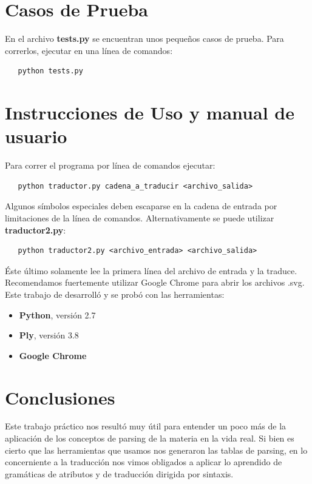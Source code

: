\newpage
\section{Casos de Prueba}

\indent En el archivo \textbf{tests.py} se encuentran unos pequeños casos de prueba.
\indent Para correrlos, ejecutar en una línea de comandos:
\begin{verbatim}
   python tests.py
\end{verbatim}

\section{Instrucciones de Uso y manual de usuario}

\indent \indent Para correr el programa por línea de comandos ejecutar:\\
\begin{verbatim}
   python traductor.py cadena_a_traducir <archivo_salida>
\end{verbatim}
\indent Algunos símbolos especiales deben escaparse en la cadena de entrada por limitaciones de la línea de comandos. 
\indent Alternativamente se puede utilizar \textbf{traductor2.py}:
\begin{verbatim}
   python traductor2.py <archivo_entrada> <archivo_salida>
\end{verbatim}
\indent Éste último solamente lee la primera línea del archivo de entrada y la traduce.\\

\indent Recomendamos fuertemente utilizar Google Chrome para abrir los archivos .svg.\\
\indent Este trabajo de desarrolló y se probó con las herramientas:
\begin{itemize}
\item \textbf{Python}, versión 2.7
\item \textbf{Ply}, versión 3.8
\item \textbf{Google Chrome}
\end{itemize}

\section{Conclusiones}

\indent Este trabajo práctico nos resultó muy útil para entender un poco más de la aplicación de los conceptos de parsing de la materia en la vida real. Si bien es cierto que las herramientas que usamos nos generaron las tablas de parsing, en lo concerniente a la traducción nos vimos obligados a aplicar lo aprendido de gramáticas de atributos y de traducción dirigida por sintaxis.\\


